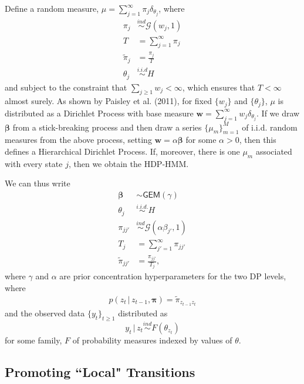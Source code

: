 \documentclass[12pt,letterpaper]{report}
\newcommand{\Gamm}[2]{\mathcal{G}(#1,#2)}
\newcommand{\given}{\, \vert \,}
\newcommand{\bw}{\mathbf{w}}
\newcommand{\bbeta}{\boldsymbol{\beta}}
\newcommand{\bpi}{\boldsymbol{\pi}}
\begin{document}
Define a random measure, $\mu = \sum_{j=1}^{\infty} \pi_j \delta_{\theta_j}$, where 
\begin{align}
  \pi_j &\stackrel{ind}{\sim} \Gamm{w_j}{1} \label{eq:17}\\
  T &= \sum_{j=1}^{\infty} \pi_j \label{eq:18}\\
  \tilde{\pi}_j &= \frac{\pi_j}{T}   \label{eq:16}\\
  \theta_j &\stackrel{i.i.d}{\sim} H \label{eq:19}
\end{align}
and subject to the constraint that $\sum_{j\geq 1} w_j < \infty$,
which ensures that $T < \infty$ almost surely.  As
shown by Paisley et al. (2011), for fixed $\{w_j\}$ and $\{\theta_j\}$, $\mu$ is distributed as a Dirichlet
Process with base measure $\bw = \sum_{j=1}^{\infty} w_j \delta_{\theta_j}$.
If we draw $\bbeta$ from a stick-breaking process and then draw a
series $\{\mu_m\}_{m=1}^M$ of
i.i.d. random measures from the above process, setting $\bw =
\alpha\bbeta$ for some $\alpha > 0$, then
this defines a Hierarchical Dirichlet Process.  If, moreover, there is
one $\mu_m$ associated with every state $j$, then we obtain the
HDP-HMM.

We can thus write
\begin{align}
  \bbeta &\sim \mathsf{GEM}(\gamma)   \label{eq:20} \\
  \theta_j &\stackrel{i.i.d.}{\sim} H \label{eq:21}\\
  \pi_{jj'} &\stackrel{ind}{\sim} \Gamm{\alpha \beta_{j'}}{1} \label{eq:22}\\
  T_j &= \sum_{j'=1}^{\infty} \pi_{jj'} \\
  \tilde{\pi}_{jj'} &= \frac{\pi_{jj'}}{T_j} \label{eq:23},
\end{align}
where $\gamma$ and $\alpha$ are prior concentration hyperparameters
for the two DP levels, where
\begin{align}
  \label{eq:50}
  p(z_t \given z_{t-1}, \bpi) = \tilde{\pi}_{z_{t-1}z_t}
\end{align}
and the observed data
$\{y_t\}_{t\geq 1}$ distributed as
\begin{equation}
  \label{eq:24}
  y_t \given z_t \stackrel{ind}{\sim} F(\theta_{z_t})
\end{equation}
for some family, $F$ of probability measures indexed by values of $\theta$.

\subsection{Promoting ``Local" Transitions}
\label{sec:prom-local-trans}
\end{document}

